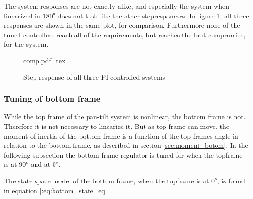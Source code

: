 \documentclass[../../../Main]{subfiles}
\begin{document}
The system responses are not exactly alike, and especially the system when linearized in $180^o$ does not look like the other stepresponeses. In figure \ref{fig:comp}, all three responses are shown in the same plot, for comparison. Furthermore none of the tuned controllers reach all of the requirements, but reaches the best compromise, for the system.

\begin{figure}[H]
\centering
\def\svgwidth{\textwidth}
{comp.pdf_tex}
\caption{Step response of all three PI-controlled systems}
\label{fig:comp}
\end{figure}

\subsubsection{Tuning of bottom frame}

While the top frame of the pan-tilt system is nonlinear, the bottom frame is not. Therefore it is not necessary to linearize it. But as top frame can move, the moment of inertia of the bottom frame is a function of the top frames angle in relation to the bottom frame, as described in section \ref{sec:moment_botom}. 
In the following subsection the bottom frame regulator is tuned for when the topframe is at $90^o$ and at $0^o$.

The state space model of the bottom frame, when the topframe is at $0^o$, is found in equation \eqref{:eq:bottom_state_eq}
\end{document}
